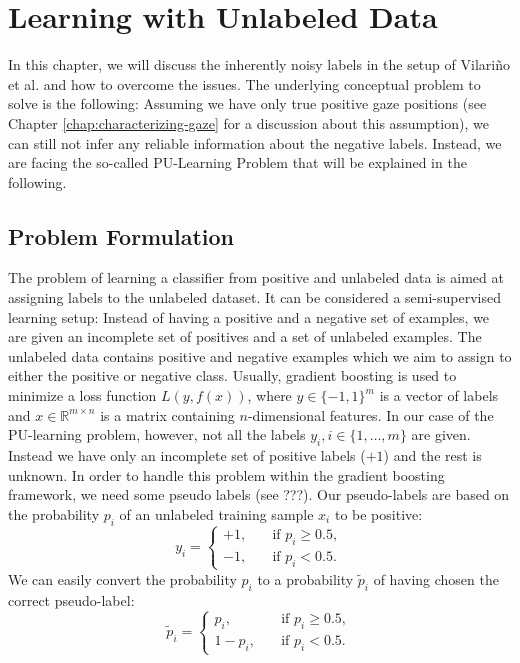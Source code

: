 \chapter{Learning with Unlabeled Data}
\label{chap:learning-with-unlabeled-data}
In this chapter, we will discuss the inherently noisy labels in the setup of Vilari\~no et al. and how to overcome the issues. 
The underlying conceptual problem to solve is the following: Assuming we have only true positive gaze positions (see Chapter \ref{chap:characterizing-gaze} for a discussion about this assumption), we can still not infer any reliable information about the negative labels. Instead, we are facing the so-called PU-Learning Problem that will be explained in the following.

\section{Problem Formulation}
The problem of learning a classifier from positive and unlabeled data is aimed at assigning labels to the unlabeled dataset. 
It can be considered a semi-supervised learning setup: Instead of having a positive and a negative set of examples, we are given an incomplete set of positives and a set of unlabeled examples. 
The unlabeled data contains positive and negative examples which we aim to assign to either the positive or negative class. 
Usually, gradient boosting is used to minimize a loss function $L(y,f(x))$, where $y \in \{-1,1\}^m$ is a vector of labels and $x \in \mathbb{R}^{m\times n}$ is a matrix containing $n$-dimensional features. In our case of the PU-learning problem, however, not all the labels $y_i, i \in \{1,\dots,m\}$ are given. 
Instead we have only an incomplete set of positive labels ($+1$) and the rest is unknown. In order to handle this problem within the gradient boosting framework, we need some pseudo labels (see ???). Our pseudo-labels are based on the probability $p_i$ of an unlabeled training sample $x_i$ to be positive:
\begin{equation*}
 y_i = 
    \begin{cases}
	+1, \quad & \text{if } p_i \geq 0.5, \\
	-1, \quad & \text{if } p_i < 0.5.
      \end{cases}
\end{equation*}
We can easily convert the probability $p_i$ to a probability $\tilde p_i$ of having chosen the correct pseudo-label:
\begin{equation*}
 \tilde p_i = 
    \begin{cases}
	p_i, \quad & \text{if } p_i \geq 0.5, \\
	1-p_i, \quad & \text{if } p_i < 0.5.
      \end{cases}
\end{equation*}

